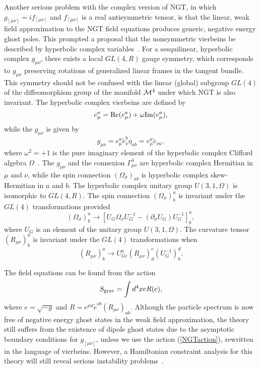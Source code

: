 \documentclass[a4paper,10pt]{article}
\begin{document}
Another serious problem with the complex version of NGT, in which
$g_{[\mu\nu]}=if_{[\mu\nu]}$ and $f_{[\mu\nu]}$ is a real antisymmetric
tensor, is that the linear, weak field approximation to the NGT field
equations produces generic, negative energy ghost poles. This prompted a
proposal that the nonsymmetric vierbeins be described by hyperbolic complex
variables~\cite{Moffat6,Moffat7}. For a sesquilinear, hyperbolic complex
$g_{\mu\nu}$, there exists a local $GL(4,R)$ gauge symmetry, which
corresponds to $g_{\mu\nu}$ preserving rotations of generalized linear
frames in the tangent bundle. This symmetry should not be confused with the
linear (global) subgroup $GL(4)$ of the diffeomorphism group of the
manifold ${\cal M}^4$ under which NGT is also invariant. The hyperbolic
complex vierbeins are defined by
\begin{equation}
e^a_\mu={\rm Re}(e^a_\mu)+\omega{\rm Im}(e^a_\mu),
\end{equation}
while the $g_{\mu\nu}$ is given by
\begin{equation}
g_{\mu\nu}=e^a_\mu{\tilde e}^b_\nu\eta_{ab}=e^a_\mu{\tilde e}_{\nu a},
\end{equation}
where $\omega^2=+1$ is the pure imaginary element of the hyperbolic complex
Clifford algebra $\Omega$~\cite{Clifford}. The $g_{\mu\nu}$ and the
connexion $\Gamma^\lambda_{\mu\nu}$ are hyperbolic complex Hermitian in
$\mu$ and $\nu$, while the spin connection $(\Omega_\sigma)_{ab}$ is
hyperbolic complex skew-Hermitian in $a$ and $b$. The hyperbolic complex
unitary group $U(3,1,\Omega)$ is isomorphic to $GL(4,R)$. The spin
connection $(\Omega_\sigma)^a_b$ is invariant under the $GL(4)$
transformations provided \begin{equation}
(\Omega_\sigma)^a_b\rightarrow[U_G\Omega_\sigma U_G^{-1}-(\partial_\sigma
U_G)U_G^{-1}]^a_b,
\end{equation}
where $U_G$ is an element of the unitary group $U(3,1,\Omega)$. The
curvature tensor $(R_{\mu\nu})^a_b$ is invariant under the $GL(4)$
transformations when
\begin{equation}
(R_{\mu\nu})^a_b\rightarrow U^a_{Gc}(R_{\mu\nu})^c_d(U_G^{-1})^d_b.
\end{equation}

The field equations can be found from the action~\cite{Moffat6,Moffat7}
\begin{equation}
S_{\rm grav}=\int d^4xeR(e),
\end{equation}
where $e=\sqrt{-g}$ and $R=e^{\mu a}{\tilde e}^{\nu b}(R_{\mu\nu})_{ab}$.
Although the particle spectrum is now free of negative energy ghost states
in the weak field approximation, the theory still suffers from the
existence of dipole ghost states due to the asymptotic boundary conditions
for $g_{[\mu\nu]}$, unless we use the action (\ref{NGTaction}),
rewritten in the language of vierbeins. However, a Hamiltonian
constraint analysis for this theory will still reveal serious
instability problems~\cite{Clayton,Clayton2}.
\end{document}
